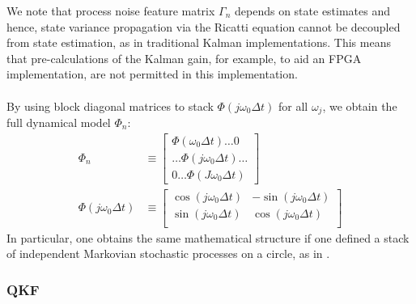 We note that process noise feature matrix $\Gamma_{n}$ depends on state estimates and hence, state variance propagation via the Ricatti equation cannot be decoupled from state estimation, as in traditional Kalman implementations. This means that pre-calculations of the Kalman gain, for example, to aid an FPGA implementation, are not permitted in this implementation. 
\\
\\
By using block diagonal matrices to stack $\Phi(j \omega_0 \Delta t) $ for all $\omega_j$, we obtain the full dynamical model $\Phi_n$:
\begin{align}
\Phi_{n} & \equiv \begin{bmatrix} 
\Phi(\omega_0 \Delta t)\hdots 0  \\ 
 \hdots \Phi(j\omega_0 \Delta t) \hdots \\
0 \hdots \Phi(J \omega_0 \Delta t)  \end{bmatrix}\\ 
\Phi(j \omega_0 \Delta t) &\equiv \begin{bmatrix} \cos(j \omega_0 \Delta t) & -\sin(j \omega_0 \Delta t) \\ \sin(j \omega_0 \Delta t) & \cos(j \omega_0 \Delta t) \\ \end{bmatrix} \label{eqn:ap_approxSP:LKFFB_Phi} 
\end{align}
In particular, one obtains the same mathematical structure if one defined a stack of independent Markovian stochastic processes on a circle, as in \cite{karlin2012}.

\subsubsection{QKF}

